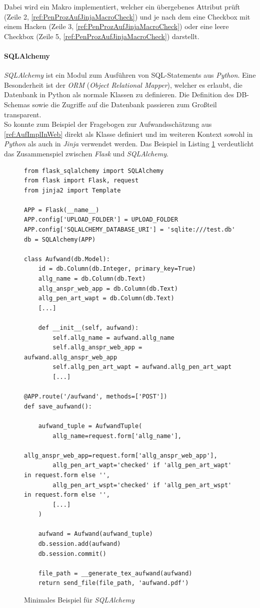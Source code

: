 Dabei wird ein Makro implementiert, welcher ein übergebenes Attribut prüft (Zeile 2, \ref{ref:PenProzAufJinjaMacroCheck}) und je nach dem eine Checkbox mit einem Hacken (Zeile 3, \ref{ref:PenProzAufJinjaMacroCheck}) oder eine leere Checkbox (Zeile 5, \ref{ref:PenProzAufJinjaMacroCheck}) darstellt.

\paragraph{SQLAlchemy}\label{ref:SQLAlchemy}
\textit{SQLAlchemy} ist ein Modul zum Ausführen von SQL-Statements aus \textit{Python}. Eine Besonderheit ist der \textit{ORM} (\textit{Object Relational Mapper}), welcher es erlaubt, die Datenbank in Python als normale Klassen zu definieren. Die Definition des DB-Schemas sowie die Zugriffe auf die Datenbank passieren zum Großteil transparent.\\

So konnte zum Beispiel der Fragebogen zur Aufwandsschätzung aus \ref{ref:AufImplInWeb} direkt als Klasse definiert und im weiteren Kontext sowohl in \textit{Python} als auch in \textit{Jinja} verwendet werden. Das Beispiel in Listing \ref{lis:PenProzSQLAlchemy} verdeutlicht das Zusammenspiel zwischen \textit{Flask} und \textit{SQLAlchemy}.

\begin{figure}
\lstset{language=Python}
\begin{lstlisting}
from flask_sqlalchemy import SQLAlchemy
from flask import Flask, request
from jinja2 import Template

APP = Flask(__name__)
APP.config['UPLOAD_FOLDER'] = UPLOAD_FOLDER
APP.config['SQLALCHEMY_DATABASE_URI'] = 'sqlite:///test.db'
db = SQLAlchemy(APP)

class Aufwand(db.Model):
    id = db.Column(db.Integer, primary_key=True)
    allg_name = db.Column(db.Text)
    allg_anspr_web_app = db.Column(db.Text)
    allg_pen_art_wapt = db.Column(db.Text)
    [...]

    def __init__(self, aufwand):
        self.allg_name = aufwand.allg_name
        self.allg_anspr_web_app = aufwand.allg_anspr_web_app
        self.allg_pen_art_wapt = aufwand.allg_pen_art_wapt
        [...]
        
@APP.route('/aufwand', methods=['POST'])
def save_aufwand():

    aufwand_tuple = AufwandTuple(
        allg_name=request.form['allg_name'],
        allg_anspr_web_app=request.form['allg_anspr_web_app'],
        allg_pen_art_wapt='checked' if 'allg_pen_art_wapt' in request.form else '',
        allg_pen_art_wspt='checked' if 'allg_pen_art_wspt' in request.form else '',
        [...]
    )

    aufwand = Aufwand(aufwand_tuple)
    db.session.add(aufwand)
    db.session.commit()

    file_path = __generate_tex_aufwand(aufwand)
    return send_file(file_path, 'aufwand.pdf')
\end{lstlisting}
\caption{Minimales Beispiel für \textit{SQLAlchemy}}
\label{lis:PenProzSQLAlchemy}
\end{figure}

